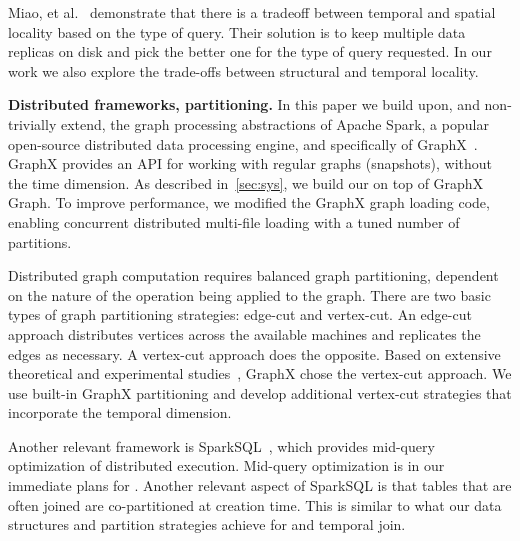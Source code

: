Miao, et al.~\cite{DBLP:journals/tos/MiaoHLWYZPCC15} demonstrate that
there is a tradeoff between temporal and spatial locality based on the
type of query.  Their solution is to keep multiple data replicas on
disk and pick the better one for the type of query requested.  In our
work we also explore the trade-offs between structural and temporal
locality.  

{\bf Distributed frameworks, partitioning.}  In this paper we build
upon, and non-trivially extend, the graph processing abstractions of
Apache Spark, a popular open-source distributed data processing
engine, and specifically of
GraphX~\cite{DBLP:conf/osdi/GonzalezXDCFS14}.  GraphX provides an API
for working with regular graphs (snapshots), without the time
dimension.  As described in~\ref{sec:sys}, we build our \tgs on top
of GraphX Graph.  To improve performance, we modified the GraphX graph
loading code, enabling concurrent distributed multi-file loading with
a tuned number of partitions.  

Distributed graph computation requires balanced graph partitioning,
dependent on the nature of the operation being applied to the graph.
There are two basic types of graph partitioning strategies: edge-cut
and vertex-cut.  An edge-cut approach distributes vertices across the
available machines and replicates the edges as necessary.  A
vertex-cut approach does the opposite.  Based on extensive theoretical
and experimental studies~\cite{Gonzalez2012}, GraphX chose the
vertex-cut approach.  We use built-in GraphX partitioning and develop
additional vertex-cut strategies that incorporate the temporal
dimension.

Another relevant framework is SparkSQL~\cite{Xin2013}, which provides
mid-query optimization of distributed execution.  Mid-query
optimization is in our immediate plans for \ql.  Another relevant
aspect of SparkSQL is that tables that are often joined are
co-partitioned at creation time.  This is similar to what our data
structures and partition strategies achieve for  and
temporal join.


